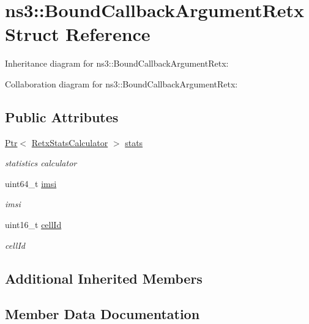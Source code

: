 \hypertarget{structns3_1_1BoundCallbackArgumentRetx}{}\section{ns3\+:\+:Bound\+Callback\+Argument\+Retx Struct Reference}
\label{structns3_1_1BoundCallbackArgumentRetx}


Inheritance diagram for ns3\+:\+:Bound\+Callback\+Argument\+Retx\+:


Collaboration diagram for ns3\+:\+:Bound\+Callback\+Argument\+Retx\+:
\subsection*{Public Attributes}
\begin{DoxyCompactItemize}
\item 
\hyperlink{classns3_1_1Ptr}{Ptr}$<$ \hyperlink{classns3_1_1RetxStatsCalculator}{Retx\+Stats\+Calculator} $>$ \hyperlink{structns3_1_1BoundCallbackArgumentRetx_a1ab102f4e151efed213a59f75d62a3e7}{stats}
\begin{DoxyCompactList}\small\item\em statistics calculator \end{DoxyCompactList}\item 
uint64\+\_\+t \hyperlink{structns3_1_1BoundCallbackArgumentRetx_a68946e052d7802b9bc07b9d66c548a44}{imsi}
\begin{DoxyCompactList}\small\item\em imsi \end{DoxyCompactList}\item 
uint16\+\_\+t \hyperlink{structns3_1_1BoundCallbackArgumentRetx_a9fb34a0b0833d5f58866e3441fef396c}{cell\+Id}
\begin{DoxyCompactList}\small\item\em cell\+Id \end{DoxyCompactList}\end{DoxyCompactItemize}
\subsection*{Additional Inherited Members}


\subsection{Member Data Documentation}
